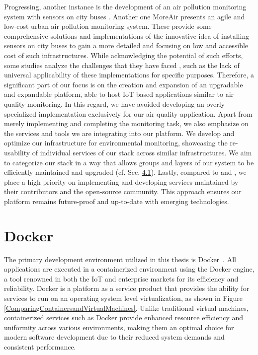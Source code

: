 Progressing, another instance is the development of an air pollution monitoring system with sensors on city buses \cite{sensorsoncitybus}. Another one MoreAir \cite{Low-CostUrbanAir} presents an agile and low-cost urban air pollution monitoring system. These provide some comprehensive solutions and implementations of the innovative idea of installing sensors on city buses to gain a more detailed and focusing on low and accessible cost of such infrastructures. While acknowledging the potential of such efforts, some studies analyze the challenges that they have faced \cite{Howfarhavetheygone}, such as the lack of universal applicability of these implementations for specific purposes. Therefore, a significant part of our focus is on the creation and expansion of an upgradable and expandable platform, able to host IoT based applications similar to air quality monitoring. In this regard, we have avoided developing an overly specialized implementation exclusively for our air quality application. Apart from merely implementing and completing the monitoring task, we also emphasize on the services and tools we are integrating into our platform. We develop and optimize our infrastructure for environmental monitoring, showcasing the re-usability of individual services of our stack across similar infrastructures. We aim to categorize our stack in a way that allows groups and layers of our system to be efficiently maintained and upgraded (cf. Sec. \hyperref[system_overview]{4.1}). Lastly, compared to \cite{SEMARkafka} and \cite{HandlingStreamAirPollutionData}, we place a high priority on implementing and developing services maintained by their contributors and the open-source community. This approach ensures our platform remains future-proof and up-to-date with emerging technologies.

\section{Docker}

The primary development environment utilized in this thesis is Docker~\cite{Docker}. All applications are executed in a containerized environment using the Docker engine, a tool renowned in both the IoT and enterprise markets for its efficiency and reliability. Docker is a platform as a service product that provides the ability for services to run on an operating system level virtualization, as shown in Figure \ref{ComparingContainersandVirtualMachines}. Unlike traditional virtual machines, containerized services such as Docker provide enhanced resource efficiency and uniformity across various environments, making them an optimal choice for modern software development due to their reduced system demands and consistent performance. 

